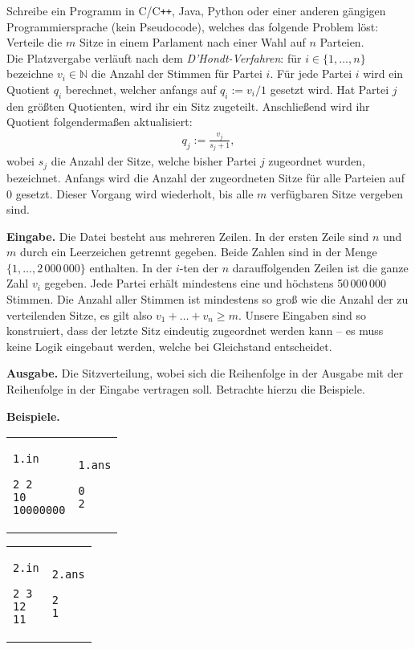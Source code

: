 \documentclass{uebung_cs}
\begin{document}
Schreibe ein Programm in C/C\texttt{++}, Java, Python oder einer anderen gängigen Programmiersprache (kein Pseudocode), welches das folgende Problem löst: 
Verteile die $m$ Sitze in einem Parlament nach einer Wahl auf $n$ Parteien.\\[0.25cm]
Die Platzvergabe verläuft nach dem \emph{D'Hondt-Verfahren}:
für $i \in \{1, \dots, n\}$ bezeichne $v_i \in \mathbb N$ die Anzahl der Stimmen für Partei $i$.
Für jede Partei $i$ wird ein Quotient $q_i$ berechnet, welcher anfangs auf $q_i := v_i/1$ gesetzt wird.
Hat Partei $j$ den größten Quotienten, wird ihr ein Sitz zugeteilt.
Anschließend wird ihr Quotient folgendermaßen aktualisiert:
\begin{align*}
    q_j := \frac{v_j}{s_j + 1},
\end{align*}
wobei $s_j$ die Anzahl der Sitze, welche bisher Partei $j$ zugeordnet wurden, bezeichnet.
Anfangs wird die Anzahl der zugeordneten Sitze für alle Parteien auf $0$ gesetzt.
Dieser Vorgang wird wiederholt, bis alle $m$ verfügbaren Sitze vergeben sind.

\textbf{Eingabe.}
Die Datei besteht aus mehreren Zeilen.
In der ersten Zeile sind $n$ und $m$ durch ein Leerzeichen getrennt gegeben.
Beide Zahlen sind in der Menge $\{1, \dots, 2\,000\,000\}$ enthalten.
In der $i$-ten der $n$ darauffolgenden Zeilen ist die ganze Zahl $v_i$ gegeben.
Jede Partei erhält mindestens eine und höchstens 50\,000\,000 Stimmen.
Die Anzahl aller Stimmen ist mindestens so groß wie die Anzahl der zu verteilenden Sitze, es gilt also $v_1 + \dots + v_n \geq m$.
Unsere Eingaben sind so konstruiert, dass der letzte Sitz eindeutig zugeordnet werden kann -- es muss keine Logik eingebaut werden, welche bei Gleichstand entscheidet.

\textbf{Ausgabe.}
Die Sitzverteilung, wobei sich die Reihenfolge in der Ausgabe mit der Reihenfolge in der Eingabe vertragen soll. Betrachte hierzu die Beispiele.

\textbf{Beispiele.}\\
\begin{tabular}{p{}p{}}
\texttt{1.in}
\begin{verbatim}
2 2
10
10000000
\end{verbatim}
&
\texttt{1.ans}
\begin{verbatim}
0
2
\end{verbatim}
\end{tabular}

\begin{tabular}{p{}p{}}
\texttt{2.in}
\begin{verbatim}
2 3
12
11
\end{verbatim}
&
\texttt{2.ans}
\begin{verbatim}
2
1
\end{verbatim}
\end{tabular}
\end{document}
